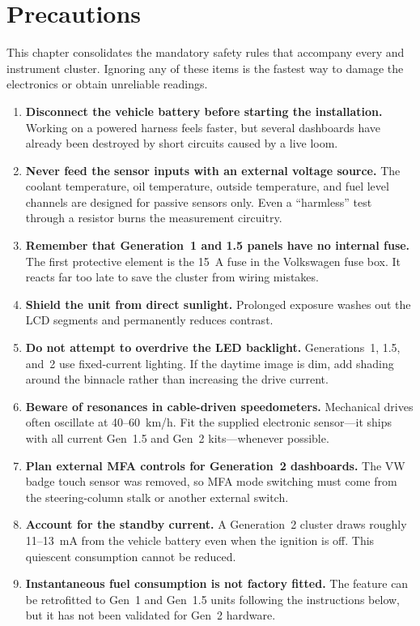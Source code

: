 \chapter{Precautions}\label{ch:precautions}

This chapter consolidates the mandatory safety rules that accompany every \ReplicaGenOne{} and \ReplicaNextLong{} instrument cluster. Ignoring any of these items is the fastest way to damage the electronics or obtain unreliable readings.

\begin{enumerate}
    \item \textbf{Disconnect the vehicle battery before starting the installation.} Working on a powered harness feels faster, but several dashboards have already been destroyed by short circuits caused by a live loom.
    \item \textbf{Never feed the sensor inputs with an external voltage source.} The coolant temperature, oil temperature, outside temperature, and fuel level channels are designed for passive sensors only. Even a “harmless” test through a resistor burns the measurement circuitry.
    \item \textbf{Remember that Generation~1 and 1.5 panels have no internal fuse.} The first protective element is the 15~A fuse in the Volkswagen fuse box. It reacts far too late to save the cluster from wiring mistakes.
    \item \textbf{Shield the unit from direct sunlight.} Prolonged exposure washes out the LCD segments and permanently reduces contrast.
    \item \textbf{Do not attempt to overdrive the LED backlight.} Generations~1, 1.5, and~2 use fixed-current lighting. If the daytime image is dim, add shading around the binnacle rather than increasing the drive current.
    \item \textbf{Beware of resonances in cable-driven speedometers.} Mechanical drives often oscillate at 40--60~km/h. Fit the supplied electronic sensor---it ships with all current Gen~1.5 and Gen~2 kits---whenever possible.
    \item \textbf{Plan external MFA controls for Generation~2 dashboards.} The VW badge touch sensor was removed, so MFA mode switching must come from the steering-column stalk or another external switch.
    \item \textbf{Account for the standby current.} A Generation~2 cluster draws roughly 11--13~mA from the vehicle battery even when the ignition is off. This quiescent consumption cannot be reduced.
    \item \textbf{Instantaneous fuel consumption is not factory fitted.} The feature can be retrofitted to Gen~1 and Gen~1.5 units following the instructions below, but it has not been validated for Gen~2 hardware.
\end{enumerate}

